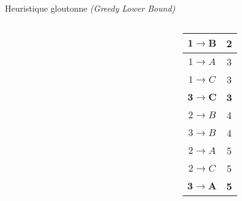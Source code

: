 \begin{frame}{Heuristique gloutonne \textit{(Greedy Lower Bound)}}
{\begin{columns}
\begin{column}{0.2\textwidth}
\begin{center}
                        \end{center}
                    \end{column}
                    \begin{column}{0.1\textwidth}
                        \begin{center}
                        \end{center}
                    \end{column}
                    \begin{column}{0.2\textwidth}
                        \begin{center}
                            \begin{tabular}{ | c | c | }
                                \hline
                                $\mathbf{1 \rightarrow B}$ & \textbf{2} \\
                                \hline
                                $1 \rightarrow A$ & 3 \\
                                \hline
                                $1 \rightarrow C$ & 3 \\
                                \hline
                                $\mathbf{3 \rightarrow C}$ & \textbf{3} \\
                                \hline
                                $2 \rightarrow B$ & 4 \\
                                \hline
                                $3 \rightarrow B$ & 4 \\
                                \hline
                                $2 \rightarrow A$ & 5 \\
                                \hline
                                $2 \rightarrow C$ & 5 \\
                                \hline
                                $\mathbf{3 \rightarrow A}$ & \textbf{5} \\
                                \hline
                            \end{tabular}
                        \end{center}
                    \end{column}
                \end{columns}
            }
        \end{frame}

